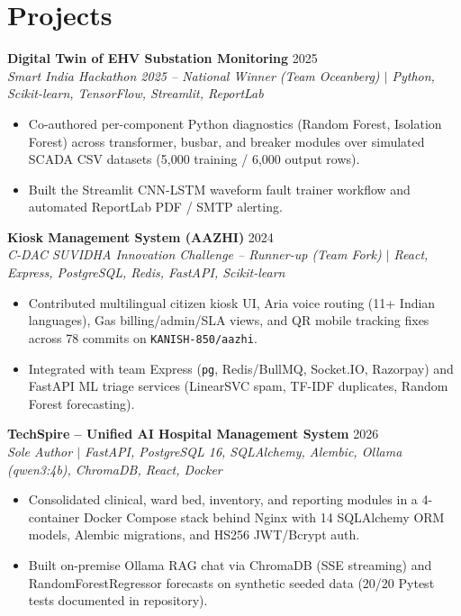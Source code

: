 \documentclass[10pt,a4paper]{article}
\begin{document}
\section*{Projects}
\textbf{Digital Twin of EHV Substation Monitoring} \hfill 2025\\
\textit{Smart India Hackathon 2025 -- National Winner (Team Oceanberg) $|$ Python, Scikit-learn, TensorFlow, Streamlit, ReportLab}
\begin{itemize}
  \item Co-authored per-component Python diagnostics (Random Forest, Isolation Forest) across transformer, busbar, and breaker modules over simulated SCADA CSV datasets (5,000 training / 6,000 output rows).
  \item Built the Streamlit CNN-LSTM waveform fault trainer workflow and automated ReportLab PDF / SMTP alerting.
\end{itemize}

\textbf{Kiosk Management System (AAZHI)} \hfill 2024\\
\textit{C-DAC SUVIDHA Innovation Challenge -- Runner-up (Team Fork) $|$ React, Express, PostgreSQL, Redis, FastAPI, Scikit-learn}
\begin{itemize}
  \item Contributed multilingual citizen kiosk UI, Aria voice routing (11+ Indian languages), Gas billing/admin/SLA views, and QR mobile tracking fixes across 78 commits on \texttt{KANISH-850/aazhi}.
  \item Integrated with team Express (\texttt{pg}, Redis/BullMQ, Socket.IO, Razorpay) and FastAPI ML triage services (LinearSVC spam, TF-IDF duplicates, Random Forest forecasting).
\end{itemize}

\textbf{TechSpire -- Unified AI Hospital Management System} \hfill 2026\\
\textit{Sole Author $|$ FastAPI, PostgreSQL 16, SQLAlchemy, Alembic, Ollama (qwen3:4b), ChromaDB, React, Docker}
\begin{itemize}
  \item Consolidated clinical, ward bed, inventory, and reporting modules in a 4-container Docker Compose stack behind Nginx with 14 SQLAlchemy ORM models, Alembic migrations, and HS256 JWT/Bcrypt auth.
  \item Built on-premise Ollama RAG chat via ChromaDB (SSE streaming) and RandomForestRegressor forecasts on synthetic seeded data (20/20 Pytest tests documented in repository).
\end{itemize}
\end{document}
